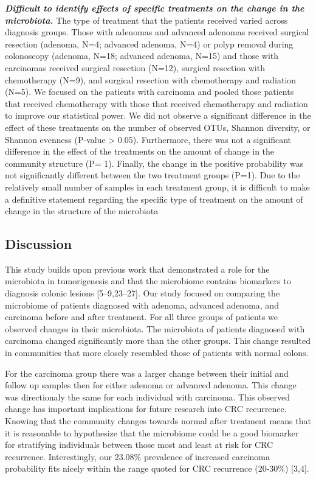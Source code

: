 \documentclass[12pt,]{article}
\begin{document}
\textbf{\emph{Difficult to identify effects of specific treatments on
the change in the microbiota.}} The type of treatment that the patients
received varied across diagnosis groups. Those with adenomas and
advanced adenomas received surgical resection (adenoma, N=4; advanced
adenoma, N=4) or polyp removal during colonoscopy (adenoma, N=18;
advanced adenoma, N=15) and those with carcinomas received surgical
resection (N=12), surgical resection with chemotherapy (N=9), and
surgical resection with chemotherapy and radiation (N=5). We focused on
the patients with carcinoma and pooled those patients that received
chemotherapy with those that received chemotherapy and radiation to
improve our statistical power. We did not observe a significant
difference in the effect of these treatments on the number of observed
OTUs, Shannon diversity, or Shannon evenness (P-value \textgreater{}
0.05). Furthermore, there was not a significant difference in the effect
of the treatments on the amount of change in the community structure (P=
1). Finally, the change in the positive probability was not
significantly different between the two treatment groups (P=1). Due to
the relatively small number of samples in each treatment group, it is
difficult to make a definitive statement regarding the specific type of
treatment on the amount of change in the structure of the microbiota

\newpage

\subsection{Discussion}\label{discussion}

This study builds upon previous work that demonstrated a role for the
microbiota in tumorigenesis and that the microbiome contains biomarkers
to diagnosis colonic lesions {[}5--9,23--27{]}. Our study focused on
comparing the microbiome of patients diagnosed with adenoma, advanced
adenoma, and carcinoma before and after treatment. For all three groups
of patients we observed changes in their microbiota. The microbiota of
patients diagnosed with carcinoma changed significantly more than the
other groups. This change resulted in communities that more closely
resembled those of patients with normal colons.

For the carcinoma group there was a larger change between their initial
and follow up samples then for either adenoma or advanced adenoma. This
change was directionaly the same for each individual with carcinoma.
This observed change has important implications for future research into
CRC recurrence. Knowing that the community changes towards normal after
treatment means that it is reasonable to hypothesize that the microbiome
could be a good biomarker for stratifying individuals between those most
and least at risk for CRC recurrence. Interestingly, our 23.08\%
prevalence of increased carcinoma probability fits nicely within the
range quoted for CRC recurrence (20-30\%) {[}3,4{]}.
\end{document}
